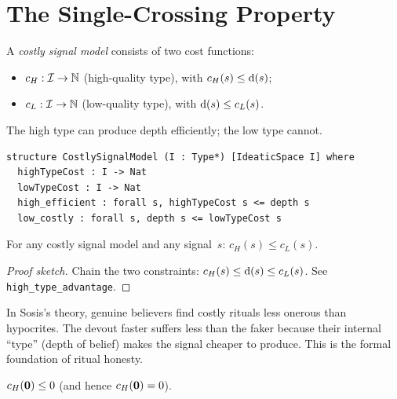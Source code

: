 \section{The Single-Crossing Property}
\label{sec:ch3:crossing}

\begin{definition}
\label{def:costly-signal-model}
A \emph{costly signal model} consists of two cost functions:
\begin{itemize}
  \item $c_H : \mathcal{I} \to \mathbb{N}$ (high-quality type), with
    $c_H(s) \leq \operatorname{d}(s)$;
  \item $c_L : \mathcal{I} \to \mathbb{N}$ (low-quality type), with
    $\operatorname{d}(s) \leq c_L(s)$.
\end{itemize}
The high type can produce depth efficiently; the low type cannot.
\end{definition}

\begin{lstlisting}[caption={CostlySignalModel in Lean~4},label=lst:costly-signal]
structure CostlySignalModel (I : Type*) [IdeaticSpace I] where
  highTypeCost : I -> Nat
  lowTypeCost : I -> Nat
  high_efficient : forall s, highTypeCost s <= depth s
  low_costly : forall s, depth s <= lowTypeCost s
\end{lstlisting}

\begin{theorem}
\label{thm:high-type-advantage}
For any costly signal model and any signal~$s$:
$c_H(s) \leq c_L(s)$.
\end{theorem}

\begin{proof}[Proof sketch]
Chain the two constraints: $c_H(s) \leq \operatorname{d}(s) \leq c_L(s)$.
See \texttt{high\_type\_advantage}.
\end{proof}

\begin{remark}
In Sosis's theory, genuine believers find costly rituals less onerous
than hypocrites.  The devout faster suffers less than the faker because
their internal ``type'' (depth of belief) makes the signal cheaper to
produce.  This is the formal foundation of ritual honesty.
\end{remark}

\begin{theorem}
\label{thm:void-free-all}
$c_H(\mathbf{0}) \leq 0$ (and hence $c_H(\mathbf{0}) = 0$).
\end{theorem}


